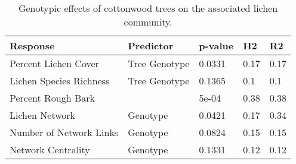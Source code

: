 \begin{table}[ht]
\centering
\begin{tabular}{lllll}
  \hline
Response & Predictor & p-value & H2 & R2 \\ 
  \hline
Percent Lichen Cover & Tree Genotype & 0.0331 & 0.17 & 0.17 \\ 
  Lichen Species Richness & Tree Genotype & 0.1365 & 0.1 & 0.1 \\ 
  Percent Rough Bark &  & 5e-04 & 0.38 & 0.38 \\ 
  Lichen Network & Genotype & 0.0421 & 0.17 & 0.34 \\ 
  Number of Network Links & Genotype & 0.0824 & 0.15 & 0.15 \\ 
  Network Centrality & Genotype & 0.1331 & 0.12 & 0.12 \\ 
   \hline
\end{tabular}
\caption{Genotypic effects of cottonwood trees on the associated lichen community.} 
\label{tab:h2_table}
\end{table}
